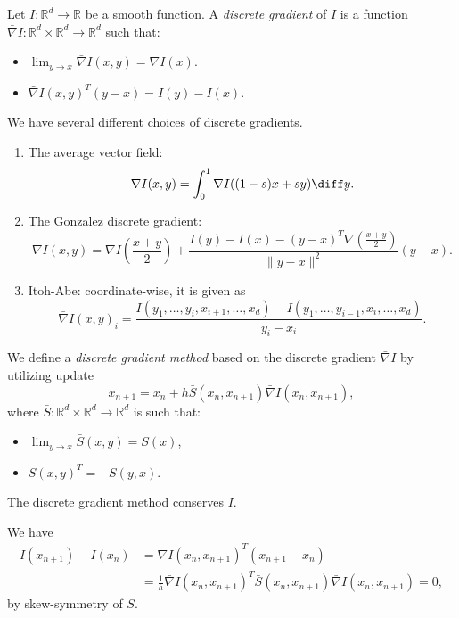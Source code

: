 \documentclass[12pt]{article}
\begin{document}
\begin{definition}
	Let $I : \mathbb{R}^{d} \to \mathbb{R}$ be a smooth function. A \emph{discrete gradient} of $I$ is a function $\bar \nabla I : \mathbb{R}^{d} \times \mathbb{R}^{d} \to \mathbb{R}^{d}$ such that:
	\begin{itemize}
		\item $\lim_{y \to x} \bar \nabla I(x, y) = \nabla I(x)$.
		\item $\bar \nabla I(x, y)^{T}(y - x) = I(y) - I(x)$.
	\end{itemize}	
\end{definition}

We have several different choices of discrete gradients.

\begin{exbox}
	\begin{enumerate}[1.]
		\item The average vector field:
			\[
			\bar \nabla I(x, y) = \int_0^{1}\nabla I((1-s) x + s y) \diff y.
			\]
		\item The Gonzalez discrete gradient:
			\[
			\bar \nabla I(x, y) = \nabla I \left( \frac{x + y}{2} \right) + \frac{I(y) - I(x) - (y - x)^{T} \nabla \left(\frac{x+y}{2}\right)}{\|y - x\|^2} (y - x).
			\]
		\item Itoh-Abe: coordinate-wise, it is given as
			\[
			\bar \nabla I(x, y)_i = \frac{I(y_1, \ldots, y_i, x_{i+1}, \ldots, x_d) - I(y_1, \ldots, y_{i-1}, x_i, \ldots, x_d)}{y_i - x_i}.
			\]
	\end{enumerate}
\end{exbox}

We define a \emph{discrete gradient method} based on the discrete gradient $\bar \nabla I$ by utilizing update
\[
x_{n+1} = x_n + h \bar S(x_n, x_{n+1}) \bar \nabla I(x_n, x_{n+1}),
\]
where $\bar S : \mathbb{R}^{d}\times \mathbb{R}^{d} \to \mathbb{R}^{d}$ is such that:
\begin{itemize}
	\item $\lim_{y \to x} \bar S(x, y) = S(x)$,
	\item $\bar S(x, y)^{T} = - \bar S(y, x)$.
\end{itemize}

\begin{proposition}
	The discrete gradient method conserves $I$.
\end{proposition}

\begin{proofbox}
	We have
	\begin{align*}
		I(x_{n+1}) - I(x_n) &= \bar \nabla I(x_n, x_{n+1})^{T}(x_{n+1} - x_n) \\
				    &= \frac 1h \bar \nabla I(x_n, x_{n+1})^{T} \bar S(x_n, x_{n+1}) \bar \nabla I(x_n, x_{n+1}) = 0,
	\end{align*}
	by skew-symmetry of $S$.
\end{proofbox}
\end{document}
